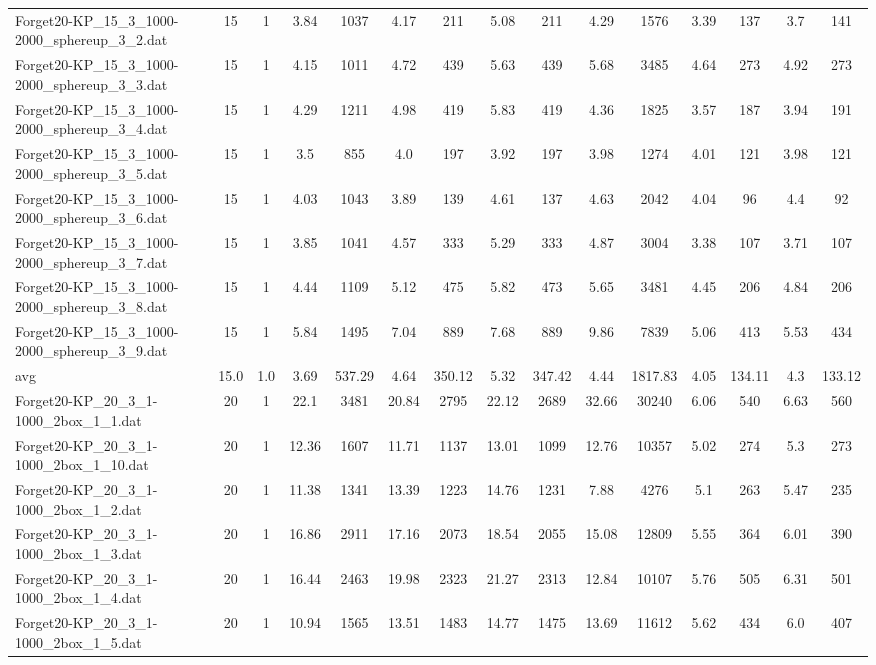 \begin{table}[!ht]
{\begin{tabular}{lcccccccccccccc}
Forget20-KP\_15\_3\_1000-2000\_sphereup\_3\_2.dat & 15 & 1 & 3.84 & 1037 & 4.17 & 211 & 5.08 & 211 & 4.29 & 1576 & 3.39 & 137 & 3.7 & 141 \\
Forget20-KP\_15\_3\_1000-2000\_sphereup\_3\_3.dat & 15 & 1 & 4.15 & 1011 & 4.72 & 439 & 5.63 & 439 & 5.68 & 3485 & 4.64 & 273 & 4.92 & 273 \\
Forget20-KP\_15\_3\_1000-2000\_sphereup\_3\_4.dat & 15 & 1 & 4.29 & 1211 & 4.98 & 419 & 5.83 & 419 & 4.36 & 1825 & 3.57 & 187 & 3.94 & 191 \\
Forget20-KP\_15\_3\_1000-2000\_sphereup\_3\_5.dat & 15 & 1 & 3.5 & 855 & 4.0 & 197 & 3.92 & 197 & 3.98 & 1274 & 4.01 & 121 & 3.98 & 121 \\
Forget20-KP\_15\_3\_1000-2000\_sphereup\_3\_6.dat & 15 & 1 & 4.03 & 1043 & 3.89 & 139 & 4.61 & 137 & 4.63 & 2042 & 4.04 & 96 & 4.4 & 92 \\
Forget20-KP\_15\_3\_1000-2000\_sphereup\_3\_7.dat & 15 & 1 & 3.85 & 1041 & 4.57 & 333 & 5.29 & 333 & 4.87 & 3004 & 3.38 & 107 & 3.71 & 107 \\
Forget20-KP\_15\_3\_1000-2000\_sphereup\_3\_8.dat & 15 & 1 & 4.44 & 1109 & 5.12 & 475 & 5.82 & 473 & 5.65 & 3481 & 4.45 & 206 & 4.84 & 206 \\
Forget20-KP\_15\_3\_1000-2000\_sphereup\_3\_9.dat & 15 & 1 & 5.84 & 1495 & 7.04 & 889 & 7.68 & 889 & 9.86 & 7839 & 5.06 & 413 & 5.53 & 434 \\
\hline avg & 15.0 & 1.0 & 3.69& 537.29 & 4.64& 350.12 & 5.32& 347.42 & 4.44& 1817.83 & 4.05& 134.11 & 4.3& 133.12\\ \hline
Forget20-KP\_20\_3\_1-1000\_2box\_1\_1.dat & 20 & 1 & 22.1 & 3481 & 20.84 & 2795 & 22.12 & 2689 & 32.66 & 30240 & 6.06 & 540 & 6.63 & 560 \\
Forget20-KP\_20\_3\_1-1000\_2box\_1\_10.dat & 20 & 1 & 12.36 & 1607 & 11.71 & 1137 & 13.01 & 1099 & 12.76 & 10357 & 5.02 & 274 & 5.3 & 273 \\
Forget20-KP\_20\_3\_1-1000\_2box\_1\_2.dat & 20 & 1 & 11.38 & 1341 & 13.39 & 1223 & 14.76 & 1231 & 7.88 & 4276 & 5.1 & 263 & 5.47 & 235 \\
Forget20-KP\_20\_3\_1-1000\_2box\_1\_3.dat & 20 & 1 & 16.86 & 2911 & 17.16 & 2073 & 18.54 & 2055 & 15.08 & 12809 & 5.55 & 364 & 6.01 & 390 \\
Forget20-KP\_20\_3\_1-1000\_2box\_1\_4.dat & 20 & 1 & 16.44 & 2463 & 19.98 & 2323 & 21.27 & 2313 & 12.84 & 10107 & 5.76 & 505 & 6.31 & 501 \\
Forget20-KP\_20\_3\_1-1000\_2box\_1\_5.dat & 20 & 1 & 10.94 & 1565 & 13.51 & 1483 & 14.77 & 1475 & 13.69 & 11612 & 5.62 & 434 & 6.0 & 407 \\

\end{tabular}}
\end{table}
